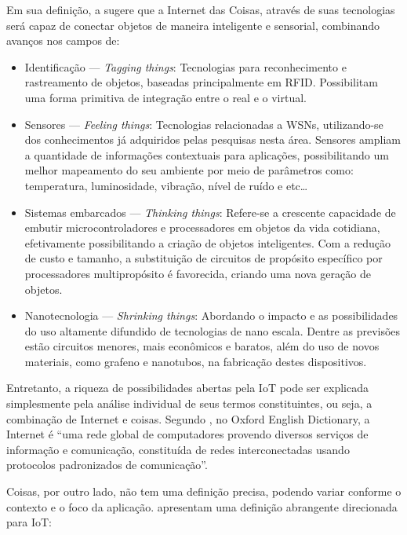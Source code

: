 \documentclass[twoside,english,brazilian]{UNISINOSmonografia}
\begin{document}
		Em sua definição, a  sugere que a Internet das 
		Coisas, através de suas tecnologias será capaz de conectar objetos de 
		maneira inteligente e sensorial, combinando avanços nos campos de:
		\begin{itemize}
			\item Identificação --- \textit{Tagging things}: Tecnologias para 
			reconhecimento e rastreamento de objetos, baseadas principalmente 
			em RFID. Possibilitam uma forma primitiva de integração entre o 
			real e o virtual.
			
			\item Sensores --- \textit{Feeling things}: Tecnologias 
			relacionadas a WSNs, utilizando-se dos conhecimentos já adquiridos 
			pelas pesquisas nesta área. Sensores ampliam a quantidade de 
			informações contextuais para aplicações, possibilitando um melhor 
			mapeamento do seu ambiente por meio de parâmetros como: 
			temperatura, luminosidade, vibração, nível de ruído e etc\ldots
			
			\item Sistemas embarcados --- \textit{Thinking things}: Refere-se 
			a crescente capacidade de embutir microcontroladores e 	
			processadores em objetos da vida cotidiana, efetivamente 
			possibilitando a criação de objetos inteligentes. Com a redução de 
			custo e tamanho, a substituição de circuitos de propósito 
			específico por processadores multipropósito é favorecida, criando 
			uma nova geração de objetos.
			
			\item Nanotecnologia --- \textit{Shrinking things}: Abordando o 
			impacto e as possibilidades do uso altamente difundido de 
			tecnologias de nano escala. Dentre as previsões estão circuitos 
			menores, mais econômicos e baratos, além do uso de novos 
			materiais, como grafeno e nanotubos, na fabricação destes 
			dispositivos.
		\end{itemize}
		
		Entretanto, a riqueza de possibilidades abertas pela IoT pode ser 
		explicada simplesmente pela análise individual de seus termos 
		constituintes, ou seja, a combinação de Internet e coisas. Segundo 
		, no Oxford English Dictionary, a Internet é 
		``uma rede global de computadores provendo diversos serviços de 
		informação e comunicação, constituída de redes interconectadas usando 
		protocolos padronizados de comunicação''.
		
		Coisas, por outro lado, não tem uma definição precisa, podendo variar 
		conforme o contexto e o foco da aplicação.  
		apresentam uma definição abrangente direcionada para IoT:
		
\end{document}
